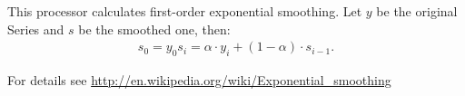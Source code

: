 This processor calculates first-order exponential smoothing.
Let $y$ be the original Series and $s$ be the smoothed one,
then:
\begin{eqnarray*}
s_0 = y_0
s_i = \alpha \cdot y_i + (1-\alpha) \cdot s_{i-1}.
\end{eqnarray*}

For details see \url{http://en.wikipedia.org/wiki/Exponential\_smoothing}
